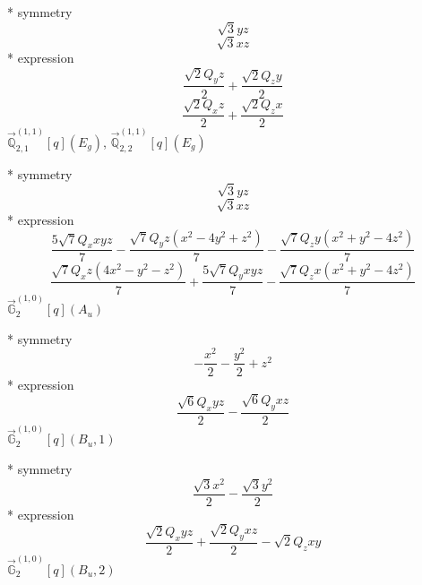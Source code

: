 \documentclass[fleqn,8pt]{jsarticle}
\begin{document}
\noindent\quad ** symmetry
\begin{dmath*}
\sqrt{3} y z
\end{dmath*}
\begin{dmath*}
\sqrt{3} x z
\end{dmath*}
\noindent\quad ** expression
\begin{dmath*}
\frac{\sqrt{2} Q_{y} z}{2} + \frac{\sqrt{2} Q_{z} y}{2}
\end{dmath*}
\begin{dmath*}
\frac{\sqrt{2} Q_{x} z}{2} + \frac{\sqrt{2} Q_{z} x}{2}
\end{dmath*}
\noindent\quad $\vec{\mathbb{Q}}_{2,1}^{(1,1)}[q](E_{g})$, $\vec{\mathbb{Q}}_{2,2}^{(1,1)}[q](E_{g})$

\noindent\quad ** symmetry
\begin{dmath*}
\sqrt{3} y z
\end{dmath*}
\begin{dmath*}
\sqrt{3} x z
\end{dmath*}
\noindent\quad ** expression
\begin{dmath*}
\frac{5 \sqrt{7} Q_{x} x y z}{7} - \frac{\sqrt{7} Q_{y} z \left(x^{2} - 4 y^{2} + z^{2}\right)}{7} - \frac{\sqrt{7} Q_{z} y \left(x^{2} + y^{2} - 4 z^{2}\right)}{7}
\end{dmath*}
\begin{dmath*}
\frac{\sqrt{7} Q_{x} z \left(4 x^{2} - y^{2} - z^{2}\right)}{7} + \frac{5 \sqrt{7} Q_{y} x y z}{7} - \frac{\sqrt{7} Q_{z} x \left(x^{2} + y^{2} - 4 z^{2}\right)}{7}
\end{dmath*}
\noindent\quad $\vec{\mathbb{G}}_{2}^{(1,0)}[q](A_{u})$

\noindent\quad ** symmetry
\begin{dmath*}
- \frac{x^{2}}{2} - \frac{y^{2}}{2} + z^{2}
\end{dmath*}
\noindent\quad ** expression
\begin{dmath*}
\frac{\sqrt{6} Q_{x} y z}{2} - \frac{\sqrt{6} Q_{y} x z}{2}
\end{dmath*}
\noindent\quad $\vec{\mathbb{G}}_{2}^{(1,0)}[q](B_{u},1)$

\noindent\quad ** symmetry
\begin{dmath*}
\frac{\sqrt{3} x^{2}}{2} - \frac{\sqrt{3} y^{2}}{2}
\end{dmath*}
\noindent\quad ** expression
\begin{dmath*}
\frac{\sqrt{2} Q_{x} y z}{2} + \frac{\sqrt{2} Q_{y} x z}{2} - \sqrt{2} Q_{z} x y
\end{dmath*}
\noindent\quad $\vec{\mathbb{G}}_{2}^{(1,0)}[q](B_{u},2)$
\end{document}
